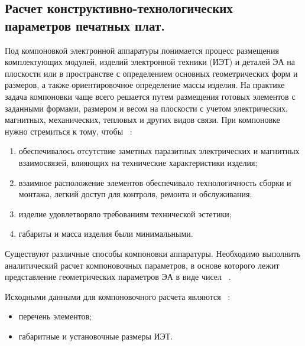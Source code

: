 \subsection{Расчет конструктивно-технологических параметров печатных плат. }


Под компоновкой электронной аппаратуры понимается процесс размещения
комплектующих модулей, изделий электронной техники (ИЭТ) и деталей ЭА
на плоскости или в пространстве с определением основных геометрических
форм и размеров, а также ориентировочное определение массы изделия.
На практике задача компоновки чаще всего решается путем размещения
готовых элементов с заданными формами, размером и весом на плоскости с
учетом электрических, магнитных, механических, тепловых и других видов
связи. При компоновке нужно стремиться к тому, чтобы
~\cite{Kostukevich2012}:

\begin{enumerate}
\item обеспечивалось отсутствие заметных паразитных электрических и магнитных взаимосвязей,
  влияющих на технические характеристики изделия;
\item взаимное расположение элементов обеспечивало технологичность сборки и монтажа,
  легкий доступ для контроля, ремонта и обслуживания;  
\item изделие удовлетворяло требованиям технической эстетики;
\item габариты и масса изделия были минимальными.
\end{enumerate}

Существуют различные способы компоновки аппаратуры.  Необходимо
выполнить аналитический расчет компоновочных параметров, в основе
которого лежит представление геометрических параметров ЭА в виде чисел
~\cite{Kostukevich2012}.

Исходными данными для компоновочного расчета являются
~\cite{Kostukevich2012}:
\begin{itemize}
\item перечень элементов;  
\item габаритные и установочные размеры ИЭТ.
\end{itemize}


